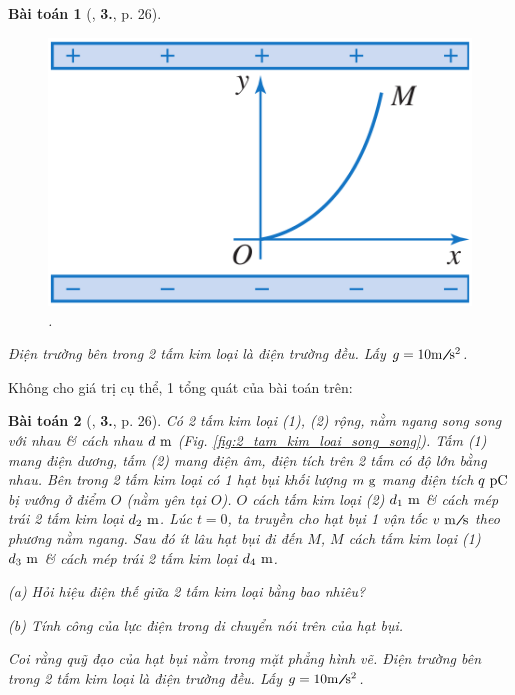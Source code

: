 \documentclass[oneside]{book}
\numberwithin{equation}{section}
\newtheorem{baitoan}{Bài toán}[section]
\begin{document}
\begin{baitoan}[\cite{SGK_Vat_Ly_11_nang_cao}, \textbf{3.}, p. 26]
\begin{figure}[H]
		\includegraphics[scale=0.15]{quy_dao_hat_bui}
		\caption{\cite[Hình 5.4, p. 26]{SGK_Vat_Ly_11_nang_cao}.}
		\label{fig:quy_dao_hat_bui}
	\end{figure}
	Điện trường bên trong 2 tấm kim loại là điện trường đều. Lấy $g = 10{\rm m\emph{\texttt{/}}s^2}$.
\end{baitoan}
Không cho giá trị cụ thể, 1 tổng quát của bài toán trên:

\begin{baitoan}[\cite{SGK_Vat_Ly_11_nang_cao}, \textbf{3.}, p. 26]
	Có 2 tấm kim loại (1), (2) rộng, nằm ngang song song với nhau \& cách nhau $d\ {\rm m}$ (Fig. \ref{fig:2_tam_kim_loai_song_song}). Tấm (1) mang điện dương, tấm (2) mang điện âm, điện tích trên 2 tấm có độ lớn bằng nhau. Bên trong 2 tấm kim loại có 1 hạt bụi khối lượng $m\ {\rm g}$ mang điện tích $q\ {\rm pC}$ bị vướng ở điểm $O$ (nằm yên tại $O$). $O$ cách tấm kim loại (2) $d_1\ {\rm m}$ \& cách mép trái 2 tấm kim loại $d_2\ {\rm m}$. Lúc $t = 0$, ta truyền cho hạt bụi 1 vận tốc $v\ {\rm m\emph{\texttt{/}}s}$ theo phương nằm ngang. Sau đó ít lâu hạt bụi đi đến $M$, $M$ cách tấm kim loại (1) $d_3\ {\rm m}$ \& cách mép trái 2 tấm kim loại $d_4\ {\rm m}$.
	\begin{enumerate*}
		\item[(a)] Hỏi hiệu điện thế giữa 2 tấm kim loại bằng bao nhiêu?
		\item[(b)] Tính công của lực điện trong di chuyển nói trên của hạt bụi.
	\end{enumerate*}
	Coi rằng quỹ đạo của hạt bụi nằm trong mặt phẳng hình vẽ. Điện trường bên trong 2 tấm kim loại là điện trường đều. Lấy $g = 10{\rm m\emph{\texttt{/}}s^2}$.
\end{baitoan}
\end{document}
